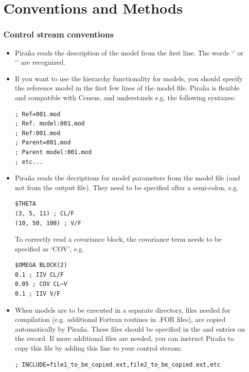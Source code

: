 \documentclass[a4,11pt]{report} \usepackage[pdftex]{graphicx}
\begin{document}
{{\section{Conventions and Methods}
\subsubsection{Control stream conventions}
\begin{itemize}
\item Pira\~na reads the description of the model from the first line. The
words `' \normalfont or `'
\normalfont are recognized.
\item If you want to use the hierarchy functionality for models, you
should specify the reference model in the first few lines of the model
file. Pira\~na is flexible and compatible with Census, and understands
e.g. the following syntaxes:

\begin{verbatim}
; Ref=001.mod
; Ref. model:001.mod
; Ref:001.mod
; Parent=001.mod
; Parent model:001.mod
; etc...
\end{verbatim}

\item Pira\~na reads the decriptions for model parameters from the
model file (and not from the output file). They need to be specified
after a semi-colon, e.g.

\begin{verbatim}
$THETA
(3, 5, 11) ; CL/F
(10, 50, 100) ; V/F
\end{verbatim}

To correctly read a covariance block, the covariance term needs to be
specified as `COV', e.g.

\begin{verbatim}
$OMEGA BLOCK(2)
0.1 ; IIV CL/F
0.05 ; COV CL~V
0.1 ; IIV V/F
\end{verbatim}

\item When models are to be executed in a separate directory, files
needed for compilation (e.g. additional Fortran routines in
.FOR files), are copied automatically by Pira\~na. These files should
be specified in the  \normalfont and 
\normalfont entries on the  \normalfont record. If
more additional files are needed, you can instruct Pira\~na to copy this
file by adding this line to your control stream:
\begin{verbatim}
; INCLUDE=file1_to_be_copied.ext,file2_to_be_copied.ext,etc
\end{verbatim}


\end{itemize}}}
\end{document}
